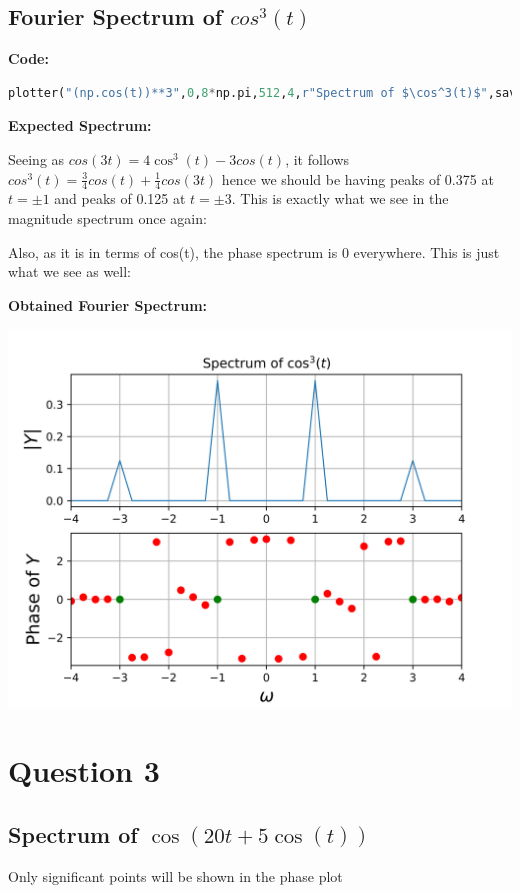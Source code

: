 \documentclass[12pt]{article}
\begin{document}
\pagebreak
\subsection{Fourier Spectrum of $cos^3(t)$}

\textbf{Code:}

\begin{lstlisting}[language=Python]
plotter("(np.cos(t))**3",0,8*np.pi,512,4,r"Spectrum of $\cos^3(t)$",save=True,fignum=6)
\end{lstlisting}

\textbf{Expected Spectrum:}

Seeing as $cos(3t)=4\cos^3(t)-3cos(t)$, it follows $cos^3(t)=\frac{3}{4}cos(t)+\frac{1}{4}cos(3t)$ hence we should be having peaks of 0.375 at $t = \pm 1$ and peaks of 0.125 at $t = \pm 3$. 
This is exactly what we see in the magnitude spectrum once again:

Also, as it is in terms of cos(t), the phase spectrum is 0 everywhere. This is just what we see as well:

\textbf{Obtained Fourier Spectrum:}

\begin{center}
    \includegraphics[scale=1]{images/fig6.png}
\end{center}
\pagebreak
\section{Question 3}
\subsection{Spectrum of $\cos(20t + 5\cos(t))$}
Only significant points will be shown in the phase plot
\end{document}
